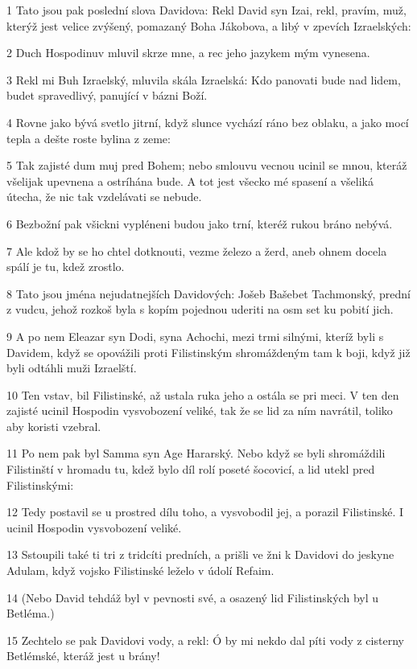 \par 1 Tato jsou pak poslední slova Davidova: Rekl David syn Izai, rekl, pravím, muž, kterýž jest velice zvýšený, pomazaný Boha Jákobova, a libý v zpevích Izraelských:
\par 2 Duch Hospodinuv mluvil skrze mne, a rec jeho jazykem mým vynesena.
\par 3 Rekl mi Buh Izraelský, mluvila skála Izraelská: Kdo panovati bude nad lidem, budet spravedlivý, panující v bázni Boží.
\par 4 Rovne jako bývá svetlo jitrní, když slunce vychází ráno bez oblaku, a jako mocí tepla a dešte roste bylina z zeme:
\par 5 Tak zajisté dum muj pred Bohem; nebo smlouvu vecnou ucinil se mnou, kteráž všelijak upevnena a ostríhána bude. A tot jest všecko mé spasení a všeliká útecha, že nic tak vzdelávati se nebude.
\par 6 Bezbožní pak všickni vypléneni budou jako trní, kteréž rukou bráno nebývá.
\par 7 Ale kdož by se ho chtel dotknouti, vezme železo a žerd, aneb ohnem docela spálí je tu, kdež zrostlo.
\par 8 Tato jsou jména nejudatnejších Davidových: Jošeb Bašebet Tachmonský, prední z vudcu, jehož rozkoš byla s kopím pojednou uderiti na osm set ku pobití jich.
\par 9 A po nem Eleazar syn Dodi, syna Achochi, mezi trmi silnými, kteríž byli s Davidem, když se opovážili proti Filistinským shromáždeným tam k boji, když již byli odtáhli muži Izraelští.
\par 10 Ten vstav, bil Filistinské, až ustala ruka jeho a ostála se pri meci. V ten den zajisté ucinil Hospodin vysvobození veliké, tak že se lid za ním navrátil, toliko aby koristi vzebral.
\par 11 Po nem pak byl Samma syn Age Hararský. Nebo když se byli shromáždili Filistinští v hromadu tu, kdež bylo díl rolí poseté šocovicí, a lid utekl pred Filistinskými:
\par 12 Tedy postavil se u prostred dílu toho, a vysvobodil jej, a porazil Filistinské. I ucinil Hospodin vysvobození veliké.
\par 13 Sstoupili také ti tri z tridcíti predních, a prišli ve žni k Davidovi do jeskyne Adulam, když vojsko Filistinské leželo v údolí Refaim.
\par 14 (Nebo David tehdáž byl v pevnosti své, a osazený lid Filistinských byl u Betléma.)
\par 15 Zechtelo se pak Davidovi vody, a rekl: Ó by mi nekdo dal píti vody z cisterny Betlémské, kteráž jest u brány!
